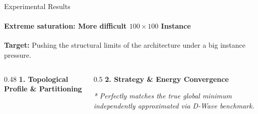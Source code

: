 \documentclass[10pt, aspectratio=169]{beamer}
\begin{document}
\begin{frame}{Experimental Results}
\framesubtitle{Extreme saturation: More difficult $100 \times 100$ Instance}
    \textbf{Target:} Pushing the structural limits of the architecture under a big instance pressure.
    \vspace{0.4cm}

    \begin{columns}[T]
        \begin{column}{0.48\textwidth}
            \textbf{1. Topological Profile \& Partitioning}
            \vspace{0.2cm}
            
        \end{column}
        
        \begin{column}{0.5\textwidth}
            \textbf{2. Strategy \& Energy Convergence}
            \vspace{0.2cm}
            
            
            \vspace{0.4cm}
            {\small \textit{* Perfectly matches the true global minimum independently approximated via D-Wave benchmark.}}
        \end{column}
    \end{columns}
\end{frame}
\end{document}
